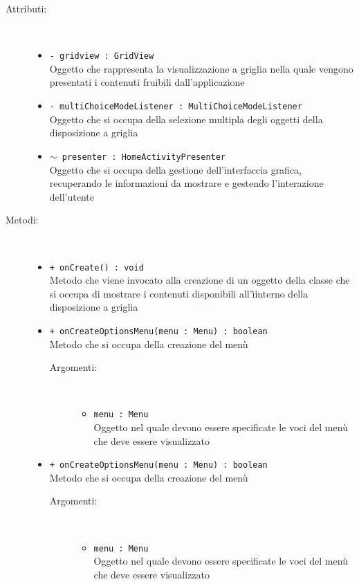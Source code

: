 \documentclass[../Tesi.tex]{subfiles}
\begin{document}
		\begin{description}
			\item[Attributi:] \
			\begin{itemize}
				\item \texttt{- gridview : GridView}\\
				Oggetto che rappresenta la visualizzazione a griglia nella quale vengono presentati i contenuti fruibili dall'applicazione

				\item \texttt{- multiChoiceModeListener : MultiChoiceModeListener}\\
				Oggetto che si occupa della selezione multipla degli oggetti della disposizione a griglia

				\item \texttt{$\sim$ presenter : HomeActivityPresenter}\\
				Oggetto che si occupa della gestione dell'interfaccia grafica, recuperando le informazioni da mostrare e gestendo l'interazione dell'utente

			\end{itemize}

			\item[Metodi:] \
			\begin{itemize}
				\item \texttt{+ onCreate() : void}\\
				Metodo che viene invocato alla creazione di un oggetto della classe  che si occupa di mostrare i contenuti disponibili all'ìinterno della disposizione a griglia
				
				\item \texttt{+ onCreateOptionsMenu(menu : Menu) : boolean}\\
				Metodo che si occupa della creazione del menù
				\begin{description}
					\item[Argomenti:] \
					\begin{itemize}
						\item \texttt{menu : Menu}\\
						Oggetto nel quale devono essere specificate le voci del menù che deve essere visualizzato
					\end{itemize}
				\end{description}

				\item \texttt{+ onCreateOptionsMenu(menu : Menu) : boolean}\\
				Metodo che si occupa della creazione del menù
				\begin{description}
					\item[Argomenti:] \
					\begin{itemize}
						\item \texttt{menu : Menu}\\
						Oggetto nel quale devono essere specificate le voci del menù che deve essere visualizzato
					\end{itemize}
				\end{description}


\end{itemize}
\end{description}
\end{document}

